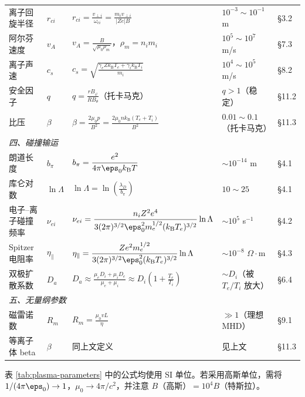 \begin{table}[htbp]
\begin{tabular}{@{}p{2.8cm}p{1.5cm}p{6.5cm}p{3.5cm}p{1.8cm}@{}}
离子回旋半径 & $r_{ci}$ & $\displaystyle r_{ci} = \frac{v_{\perp i}}{\omega_{ci}} = \frac{m_i v_{\perp i}}{|Ze|B}$ & $10^{-3}\sim10^{-1}$ m & \S 3.2 \\
阿尔芬速度 & $v_A$ & $\displaystyle v_A = \frac{B}{\sqrt{\mu_0\rho_m}}$，$\rho_m=n_i m_i$ & $10^{5}\sim10^{7}$ m/s & \S 7.3 \\
离子声速 & $c_s$ & $\displaystyle c_s = \sqrt{\frac{\gamma_e Z k_\mathrm{B}T_e + \gamma_i k_\mathrm{B}T_i}{m_i}}$ & $10^{4}\sim10^{5}$ m/s & \S 8.2 \\
安全因子 & $q$ & $\displaystyle q = \frac{r B_\varphi}{R B_\theta}$（托卡马克）& $q>1$（稳定）& \S 11.2 \\
比压 & $\beta$ & $\displaystyle\beta = \frac{2\mu_0 p}{B^2} = \frac{2\mu_0 n k_\mathrm{B}(T_e+T_i)}{B^2}$ & $0.01\sim0.1$（托卡马克）& \S 11.3 \\
\midrule
\multicolumn{5}{l}{\textit{四、碰撞输运}} \\
\midrule
朗道长度 & $b_\pi$ & $\displaystyle b_\pi = \frac{e^2}{4\pi\eps_0 k_\mathrm{B}T}$ & $\sim 10^{-14}$ m & \S 4.1 \\
库仑对数 & $\ln\Lambda$ & $\displaystyle\ln\Lambda = \ln\!\left(\frac{\lambda_D}{b_\pi}\right)$ & $10\sim 25$ & \S 4.1 \\
电子--离子碰撞频率 & $\nu_{ei}$ & $\displaystyle\nu_{ei} = \frac{n_i Z^2 e^4}{3(2\pi)^{3/2}\eps_0^2 m_e^{1/2}(k_\mathrm{B}T_e)^{3/2}}\ln\Lambda$ & $\sim 10^{5}$ s$^{-1}$ & \S 4.2 \\
Spitzer 电阻率 & $\eta_\parallel$ & $\displaystyle\eta_\parallel = \frac{Z e^2 m_e^{1/2}}{3(2\pi)^{3/2}\eps_0^2(k_\mathrm{B}T_e)^{3/2}}\ln\Lambda$ & $\sim 10^{-8}$ $\Omega\cdot$m & \S 4.3 \\
双极扩散系数 & $D_a$ & $\displaystyle D_a \approx \frac{\mu_e D_i + \mu_i D_e}{\mu_e + \mu_i}\approx D_i\left(1+\frac{T_e}{T_i}\right)$ & $\sim D_i$（被 $T_e/T_i$ 放大）& \S 6.4 \\
\midrule
\multicolumn{5}{l}{\textit{五、无量纲参数}} \\
\midrule
磁雷诺数 & $R_m$ & $\displaystyle R_m = \frac{\mu_0 v L}{\eta}$ & $\gg 1$（理想 MHD）& \S 9.1 \\
等离子体 beta & $\beta$ & 同上文定义 & 见上文 & \S 11.3 \\
\bottomrule
\end{tabular}
\end{table}

\begin{insight}{}{}
表 \ref{tab:plasma-parameters} 中的公式均使用 SI 单位。若采用高斯单位，需将 $1/(4\pi\eps_0)\to 1$，$\mu_0\to 4\pi/c^2$，并注意 $B$（高斯）$=10^4 B$（特斯拉）。
\end{insight}

